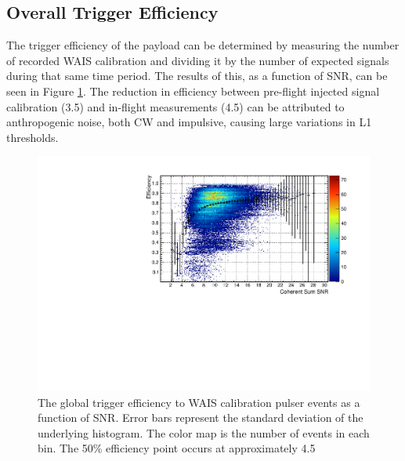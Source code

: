 		
		
	\subsection{Overall Trigger Efficiency}
		The trigger efficiency of the payload can be determined by measuring the number of recorded WAIS calibration and dividing it by the number of expected signals during that same time period.  The results of this, as a function of SNR, can be seen in Figure \ref{fig:waisEfficiency}.  The reduction in efficiency between pre-flight injected signal calibration (3.5) and in-flight measurements (4.5) can be attributed to anthropogenic noise, both CW and impulsive, causing large variations in L1 thresholds.

\begin{figure}
	\label{fig:waisEfficiency}
		\centering
		\includegraphics[width=\textwidth]{figures/waisEfficiency}
		\caption{The global trigger efficiency to WAIS calibration pulser events as a function of SNR.  Error bars represent the standard deviation of the underlying histogram.  The color map is the number of events in each bin.  The 50\% efficiency point occurs at approximately 4.5}
\end{figure}	
		



